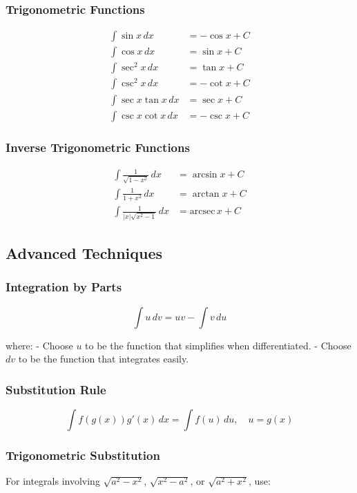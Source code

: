 \documentclass[../Main.tex]{subfiles}
\begin{document}
\subsubsection{Trigonometric Functions}
\begin{align}
\int \sin x \, dx &= -\cos x + C \\
\int \cos x \, dx &= \sin x + C \\
\int \sec^2 x \, dx &= \tan x + C \\
\int \csc^2 x \, dx &= -\cot x + C \\
\int \sec x \tan x \, dx &= \sec x + C \\
\int \csc x \cot x \, dx &= -\csc x + C
\end{align}

\subsubsection{Inverse Trigonometric Functions}
\begin{align}
\int \frac{1}{\sqrt{1-x^2}} \, dx &= \arcsin x + C \\
\int \frac{1}{1+x^2} \, dx &= \arctan x + C \\
\int \frac{1}{|x|\sqrt{x^2 - 1}} \, dx &= \text{arcsec}\, x + C
\end{align}

\subsection{Advanced Techniques}

\subsubsection{Integration by Parts}
\begin{equation}
\int u \, dv = uv - \int v \, du
\end{equation}

where:
- Choose $u$ to be the function that simplifies when differentiated.
- Choose $dv$ to be the function that integrates easily.

\subsubsection{Substitution Rule}
\begin{equation}
\int f(g(x)) g'(x) \, dx = \int f(u) \, du, \quad u = g(x)
\end{equation}

\subsubsection{Trigonometric Substitution}
For integrals involving $\sqrt{a^2 - x^2}$, $\sqrt{x^2 - a^2}$, or $\sqrt{a^2 + x^2}$, use:
\end{document}
